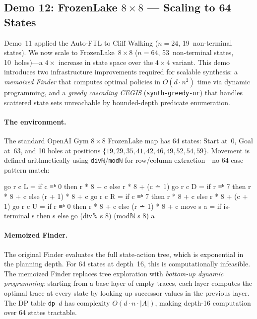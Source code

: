 \subsection{Demo 12: FrozenLake \texorpdfstring{$8 \times 8$}{8x8} --- Scaling to 64 States}
\label{sec:e2e-frozenlake8x8}

Demo~11 applied the Auto-FTL to Cliff Walking ($n = 24$, 19~non-terminal states).  We now scale to FrozenLake~$8{\times}8$ ($n = 64$, 53~non-terminal states, 10~holes)---a $4\times$ increase in state space over the $4{\times}4$ variant.  This demo introduces two infrastructure improvements required for scalable synthesis: a \emph{memoized Finder} that computes optimal policies in $O(d \cdot n^2)$ time via dynamic programming, and a \emph{greedy cascading CEGIS} (\texttt{synth-greedy-or}) that handles scattered state sets unreachable by bounded-depth predicate enumeration.

\paragraph{The environment.}
The standard OpenAI Gym $8{\times}8$ FrozenLake map has 64 states: Start at~0, Goal at~63, and 10 holes at positions $\{19, 29, 35, 41, 42, 46, 49, 52, 54, 59\}$.  Movement is defined arithmetically using \texttt{divℕ}/\texttt{modℕ} for row/column extraction---no 64-case pattern match:

\begin{spec}
go r c L = if c ≡ᵇ 0 then r * 8 + c else r * 8 + (c ∸ 1)
go r c D = if r ≡ᵇ 7 then r * 8 + c else (r + 1) * 8 + c
go r c R = if c ≡ᵇ 7 then r * 8 + c else r * 8 + (c + 1)
go r c U = if r ≡ᵇ 0 then r * 8 + c else (r ∸ 1) * 8 + c
move s a = if is-terminal s then s else go (divℕ s 8) (modℕ s 8) a
\end{spec}

\paragraph{Memoized Finder.}
The original Finder evaluates the full state-action tree, which is exponential in the planning depth.  For 64 states at depth~16, this is computationally infeasible.  The memoized Finder replaces tree exploration with \emph{bottom-up dynamic programming}: starting from a base layer of empty traces, each layer computes the optimal trace at every state by looking up successor values in the previous layer.  The DP table \texttt{dp~$d$} has complexity $O(d \cdot n \cdot |A|)$, making depth-16 computation over 64 states tractable.

